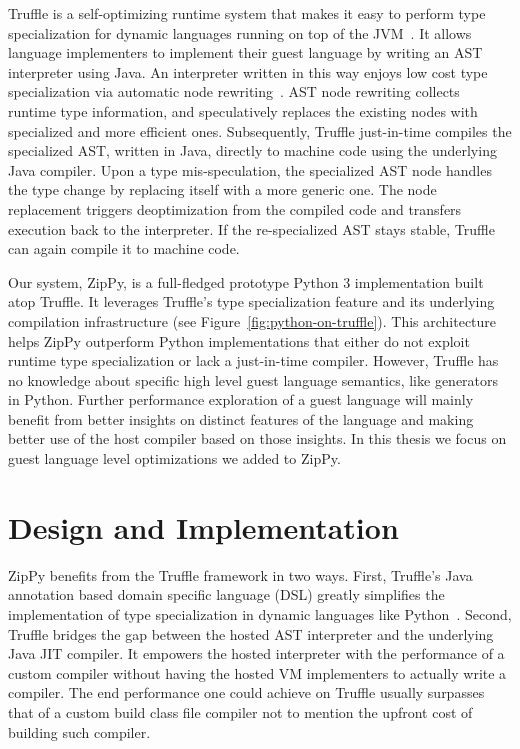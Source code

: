 Truffle is a self-optimizing runtime system that makes it easy to perform type specialization for dynamic languages running on top of the JVM~\cite{Wurthinger+13}.
It allows language implementers to implement their guest language by writing an AST interpreter using Java.
An interpreter written in this way enjoys low cost type specialization via automatic node rewriting~\cite{Wurthinger+12,Brunthaler2010inca,Brunthaler2010quickening}.
AST node rewriting collects runtime type information, and speculatively replaces the existing nodes with specialized and more efficient ones.
Subsequently, Truffle just-in-time compiles the specialized AST, written in Java, directly to machine code using the underlying Java compiler.
Upon a type mis-speculation, the specialized AST node handles the type change by replacing itself with a more generic one.
The node replacement triggers deoptimization from the compiled code and transfers execution back to the interpreter.
If the re-specialized AST stays stable, Truffle can again compile it to machine code.

Our system, ZipPy, is a full-fledged prototype Python 3 implementation built atop Truffle.
It leverages Truffle's type specialization feature and its underlying compilation infrastructure (see Figure~\ref{fig:python-on-truffle}).
This architecture helps ZipPy outperform Python implementations that either do not exploit runtime type specialization or lack a just-in-time compiler.
However, Truffle has no knowledge about specific high level guest language semantics, like generators in Python.
Further performance exploration of a guest language will mainly benefit from better insights on distinct features of the language and
making better use of the host compiler based on those insights.
In this thesis we focus on guest language level optimizations we added to ZipPy.

\section{Design and Implementation}

ZipPy benefits from the Truffle framework in two ways.
First, Truffle's Java annotation based domain specific language (DSL) greatly simplifies the implementation of type specialization in dynamic languages like Python~\cite{Humer+2014}.
Second, Truffle bridges the gap between the hosted AST interpreter and the underlying Java JIT compiler.
It empowers the hosted interpreter with the performance of a custom compiler without having the hosted VM implementers to actually write a compiler.
The end performance one could achieve on Truffle usually surpasses that of a custom build class file compiler not to mention the upfront cost of building such compiler.


